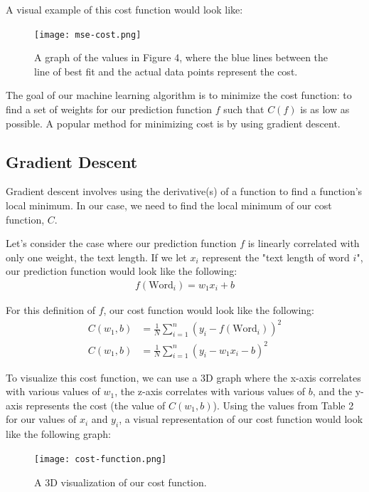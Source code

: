 \documentclass[12pt, demo]{article}
\begin{document}
A visual example of this cost function would look like:

\begin{figure}[H]
	\centering
	\caption{A graph of the values in Figure 4, where the blue lines between the line of best fit and the actual data points represent the cost.}
	\texttt{[image: mse-cost.png]}
\end{figure}

The goal of our machine learning algorithm is to minimize the cost function: to find a set of weights for our prediction function $f$ such that $C(f)$ is as low as possible. A popular method for minimizing cost is by using gradient descent.

\subsection*{Gradient Descent}

Gradient descent involves using the derivative(s) of a function to find a function's local minimum. In our case, we need to find the local minimum of our cost function, $C$.

Let's consider the case where our prediction function $f$ is linearly correlated with only one weight, the text length. If we let $x_i$ represent the "text length of word $i$", our prediction function would look like the following:
\begin{align*}
	f(\text{Word}_i) = w_1x_i + b
\end{align*}

For this definition of $f$, our cost function would look like the following:
\begin{align*}
	C(w_1, b) & = \frac{1}{N} \sum_{i=1}^{n} (y_i - f(\text{Word}_i))^2
	\\
	C(w_1, b) & = \frac{1}{N} \sum_{i=1}^{n} (y_i - w_1x_i - b)^2
\end{align*}

To visualize this cost function, we can use a 3D graph where the x-axis correlates with various values of $w_1$, the z-axis correlates with various values of $b$, and the y-axis represents the cost (the value of $C(w_1, b)$). Using the values from Table 2 for our values of $x_i$ and $y_i$, a visual representation of our cost function would look like the following graph:
\begin{figure}[H]
	\centering
	\caption{A 3D visualization of our cost function.}
	\texttt{[image: cost-function.png]}
\end{figure}
\end{document}
